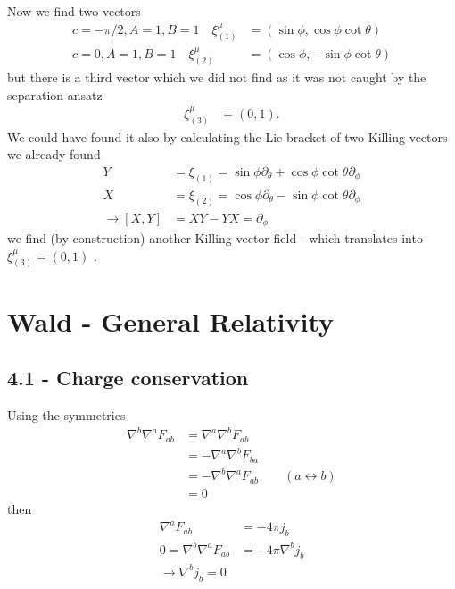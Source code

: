 \documentclass[10pt,a4paper]{book}
\theoremstyle{definition}
\begin{document}
Now we find two vectors
\begin{align}
c=-\pi/2, A=1, B=1\quad \xi^\mu_{(1)}&=(\sin\phi,\cos\phi\cot\theta)\\
c=0, A=1, B=1\quad \xi^\mu_{(2)}&=(\cos\phi,-\sin\phi\cot\theta)
\end{align}
but there is a third vector which we did not find as it was not caught by the separation ansatz
\begin{align}
\xi^\mu_{(3)}&=(0,1).
\end{align}
We could have found it also by calculating the Lie bracket of two Killing vectors we already found
\begin{align}
Y&=\xi_{(1)}=\sin\phi\partial_\theta+\cos\phi\cot\theta\partial_\phi\\
X&=\xi_{(2)}=\cos\phi\partial_\theta-\sin\phi\cot\theta\partial_\phi\\
\rightarrow[X,Y]&=XY-YX=\partial_\phi
\end{align}
we find (by construction) another Killing vector field - which translates into $\xi^\mu_{(3)}=(0,1)$ .

\section{{\sc Wald} - General Relativity}
\subsection{4.1 - Charge conservation}
Using the symmetries
\begin{align}
\nabla^b\nabla^aF_{ab}
&=\nabla^a\nabla^bF_{ab}\\
&=-\nabla^a\nabla^bF_{ba}\\
&=-\nabla^b\nabla^aF_{ab}\qquad (a\leftrightarrow b)\\
&=0
\end{align}
then
\begin{align}
\nabla^aF_{ab}&=-4\pi j_b\\
0=\nabla^b\nabla^aF_{ab}&=-4\pi \nabla^b j_b\\
\rightarrow \nabla^b j_b=0
\end{align}
\end{document}
